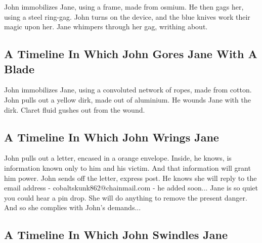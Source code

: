 \documentclass{article}
\begin{document}
John immobilizes Jane, using a frame, made from osmium.
He then gags her, using a steel ring{-}gag.
John turns on the device, and the blue knives work their magic upon her.
Jane whimpers through her gag, writhing about.
\subsection{A Timeline In Which John Gores Jane With A Blade}


John immobilizes Jane, using a convoluted network of ropes, made from cotton.
John pulls out a yellow dirk, made out of aluminium.
He wounds Jane with the dirk.
Claret fluid gushes out from the wound.
\subsection{A Timeline In Which John Wrings Jane}


John pulls out a letter, encased in a orange envelope. Inside, he knows, is information known only to him and his victim. And that information will grant him power.
John sends off the letter, express post. He knows she will reply to the email address {-} cobaltskunk862@chainmail.com {-} he added soon...
Jane is so quiet you could hear a pin drop. She will do anything to remove the present danger. And so she complies with John's demands...
\subsection{A Timeline In Which John Swindles Jane}
\end{document}
